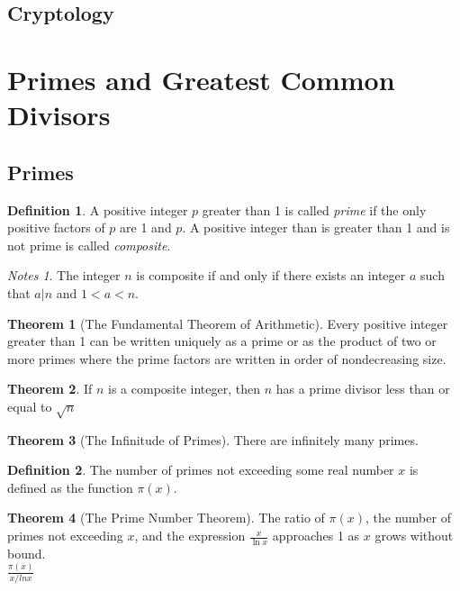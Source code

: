 \documentclass[11pt]{book} %
\theoremstyle {definition}
\newtheorem {definition}{Definition}[section]
\newtheorem {theorem}{Theorem}[section]
\theoremstyle {remark}
\newtheorem*{notes}{Notes}
\begin{document}
  \subsection {Cryptology}

\section {Primes and Greatest Common Divisors}
  \subsection {Primes}
\begin{definition}
A positive integer $p$ greater than 1 is called \textit{prime} if the only positive factors of $p$ are 1 and $p$. A positive integer than is greater than 1 and is not prime is called \textit{composite}.
\end{definition}

\begin{notes}
The integer $n$ is composite if and only if there exists an integer $a$ such that $a \vert n$ and $1<a<n$.
\end{notes}

\begin{theorem} [The Fundamental Theorem of Arithmetic]
Every positive integer greater than 1 can be written uniquely as a prime or as the product of two or more primes where the prime factors are written in order of nondecreasing size.
\end{theorem}

\begin{theorem}
If $n$ is a composite integer, then $n$ has a prime divisor less than or equal to $\sqrt{n}$
\end{theorem}

\begin{theorem}[The Infinitude of Primes]
There are infinitely many primes.
\end{theorem}

\begin{definition}
The number of primes not exceeding some real number $x$ is defined as the function $\pi(x)$.
\end{definition}

\begin{theorem}[The Prime Number Theorem]
The ratio of $\pi(x)$, the number of primes not exceeding $x$, and the expression $\frac{x}{\ln{x}}$ approaches 1 as $x$ grows without bound.\\
$\frac{\pi(x)}{x / ln x}$
\end{theorem}
\end{document}
